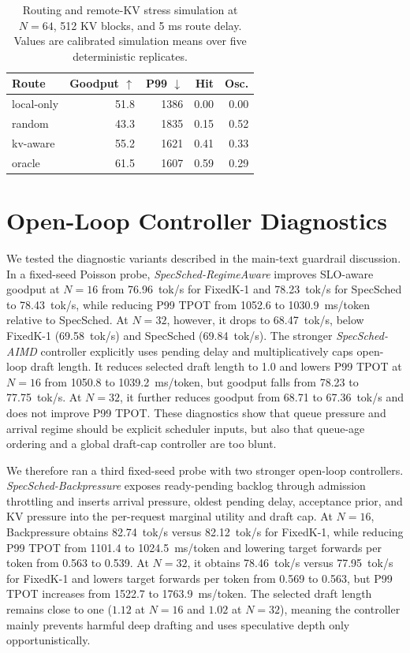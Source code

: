 \documentclass[10pt,journal,onecolumn]{IEEEtran}
\newcommand{\system}{SpecSched}
\begin{document}
\begin{table}[t]
\centering
\caption{Routing and remote-KV stress simulation at $N=64$, 512 KV
blocks, and 5 ms route delay. Values are calibrated simulation means
over five deterministic replicates.}
\label{tab:route-kv-sim}
\scriptsize
\setlength{\tabcolsep}{3.2pt}
\renewcommand{\arraystretch}{1.12}
\begin{tabular}{@{}lrrrr@{}}
\toprule
Route & Goodput $\uparrow$ & P99 $\downarrow$ & Hit & Osc. \\
\midrule
local-only & 51.8 & 1386 & 0.00 & 0.00 \\
random & 43.3 & 1835 & 0.15 & 0.52 \\
kv-aware & 55.2 & 1621 & 0.41 & 0.33 \\
oracle & 61.5 & 1607 & 0.59 & 0.29 \\
\bottomrule
\end{tabular}
\vspace{-0.5em}
\end{table}

\section{Open-Loop Controller Diagnostics}
\label{app:open-loop-diag}

We tested the diagnostic variants described in the main-text guardrail
discussion. In a fixed-seed Poisson probe,
\textit{\system{}-RegimeAware} improves SLO-aware goodput at $N=16$
from 76.96~tok/s for FixedK-1 and 78.23~tok/s for \system{} to
78.43~tok/s, while reducing P99 TPOT from 1052.6 to
1030.9~ms/token relative to \system{}. At $N=32$, however, it drops
to 68.47~tok/s, below FixedK-1 (69.58~tok/s) and \system{}
(69.84~tok/s). The stronger \textit{\system{}-AIMD} controller
explicitly uses pending delay and multiplicatively caps open-loop
draft length. It reduces selected draft length to 1.0 and lowers P99
TPOT at $N=16$ from 1050.8 to 1039.2~ms/token, but goodput falls from
78.23 to 77.75~tok/s. At $N=32$, it further reduces goodput from
68.71 to 67.36~tok/s and does not improve P99 TPOT. These diagnostics
show that queue pressure and arrival regime should be explicit
scheduler inputs, but also that queue-age ordering and a global
draft-cap controller are too blunt.

We therefore ran a third fixed-seed probe with two stronger open-loop
controllers. \textit{\system{}-Backpressure} exposes ready-pending
backlog through admission throttling and inserts arrival pressure,
oldest pending delay, acceptance prior, and KV pressure into the
per-request marginal utility and draft cap. At $N=16$, Backpressure
obtains 82.74~tok/s versus 82.12~tok/s for FixedK-1, while reducing
P99 TPOT from 1101.4 to 1024.5~ms/token and lowering target forwards
per token from 0.563 to 0.539. At $N=32$, it obtains 78.46~tok/s
versus 77.95~tok/s for FixedK-1 and lowers target forwards per token
from 0.569 to 0.563, but P99 TPOT increases from 1522.7 to
1763.9~ms/token. The selected draft length remains close to one
($1.12$ at $N=16$ and $1.02$ at $N=32$), meaning the controller mainly
prevents harmful deep drafting and uses speculative depth only
opportunistically.
\end{document}
